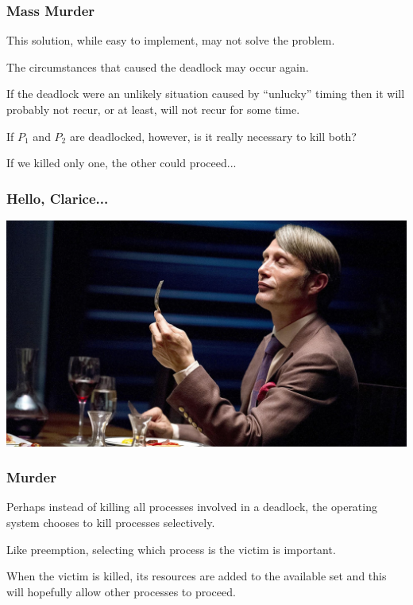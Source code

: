 \begin{frame}
	\frametitle{Mass Murder}

	This solution, while easy to implement, may not solve the problem.

	The circumstances that caused the deadlock may occur again.

	If the deadlock were an unlikely situation caused by ``unlucky'' timing then it will probably not recur, or at least, will not recur for some time.

	If $P_{1}$ and $P_{2}$ are deadlocked, however, is it really necessary to kill both?

	If we killed only one, the other could proceed...

\end{frame}


\begin{frame}
	\frametitle{Hello, Clarice...}

	\begin{center}
		\includegraphics[width=\textwidth]{images/mikkelsen.jpg}
	\end{center}

\end{frame}


\begin{frame}
	\frametitle{Murder}

	Perhaps instead of killing all processes involved in a deadlock, the operating system chooses to kill processes selectively.

	Like preemption, selecting which process is the victim is important.

	When the victim is killed, its resources are added to the available set and this will hopefully allow other processes to proceed.

\end{frame}

